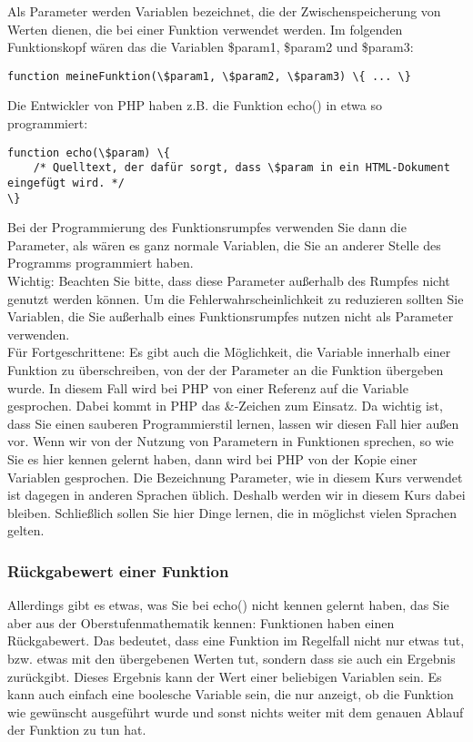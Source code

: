 Als Parameter werden Variablen bezeichnet, die der Zwischenspeicherung von Werten dienen, die bei einer Funktion verwendet werden. Im folgenden Funktionskopf wären das die Variablen \$param1, \$param2 und \$param3:\\

\begin{verbatim}
function meineFunktion(\$param1, \$param2, \$param3) \{ ... \}
\end{verbatim}

Die Entwickler von PHP haben z.B. die Funktion echo() in etwa so programmiert:

\begin{verbatim}
function echo(\$param) \{ 
	/* Quelltext, der dafür sorgt, dass \$param in ein HTML-Dokument eingefügt wird. */ 
\}
\end{verbatim}

Bei der Programmierung des Funktionsrumpfes verwenden Sie dann die Parameter, als wären es ganz normale Variablen, die Sie an anderer Stelle des Programms programmiert haben. \\

Wichtig: Beachten Sie bitte, dass diese Parameter außerhalb des Rumpfes nicht genutzt werden können. Um die Fehlerwahrscheinlichkeit zu reduzieren sollten Sie Variablen, die Sie außerhalb eines Funktionsrumpfes nutzen nicht als Parameter verwenden.\\

Für Fortgeschrittene: Es gibt auch die Möglichkeit, die Variable innerhalb einer Funktion zu überschreiben, von der der Parameter an die Funktion übergeben wurde. In diesem Fall wird bei PHP von einer Referenz auf die Variable gesprochen. Dabei kommt in PHP das \&-Zeichen zum Einsatz. Da wichtig ist, dass Sie einen sauberen Programmierstil lernen, lassen wir diesen Fall hier außen vor. Wenn wir von der Nutzung von Parametern in Funktionen sprechen, so wie Sie es hier kennen gelernt haben, dann wird bei PHP von der Kopie einer Variablen gesprochen. Die Bezeichnung Parameter, wie in diesem Kurs verwendet ist dagegen in anderen Sprachen üblich. Deshalb werden wir in diesem Kurs dabei bleiben. Schließlich sollen Sie hier Dinge lernen, die in möglichst vielen Sprachen gelten.

\subsubsection{Rückgabewert einer Funktion}

Allerdings gibt es etwas, was Sie bei echo() nicht kennen gelernt haben, das Sie aber aus der Oberstufenmathematik kennen: Funktionen haben einen Rückgabewert. Das bedeutet, dass eine Funktion im Regelfall nicht nur etwas tut, bzw. etwas mit den übergebenen Werten tut, sondern dass sie auch ein Ergebnis zurückgibt. Dieses Ergebnis kann der Wert einer beliebigen Variablen sein. Es kann auch einfach eine boolesche Variable sein, die nur anzeigt, ob die Funktion wie gewünscht ausgeführt wurde und sonst nichts weiter mit dem genauen Ablauf der Funktion zu tun hat.\\


